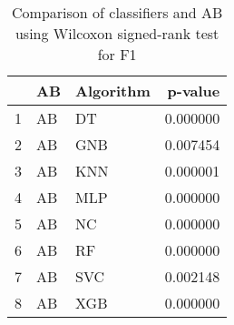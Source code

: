 \begin{table}
\footnotesize
\caption{Comparison of classifiers and AB using Wilcoxon signed-rank test for F1}
\label{tab:AB wilcoxon F1 comparison}
\begin{tabular}{lllr}
\hline
 & AB & Algorithm & p-value \\
\hline
1 & AB & DT & 0.000000 \\
2 & AB & GNB & 0.007454 \\
3 & AB & KNN & 0.000001 \\
4 & AB & MLP & 0.000000 \\
5 & AB & NC & 0.000000 \\
6 & AB & RF & 0.000000 \\
7 & AB & SVC & 0.002148 \\
8 & AB & XGB & 0.000000 \\
\hline
\end{tabular}
\end{table}
